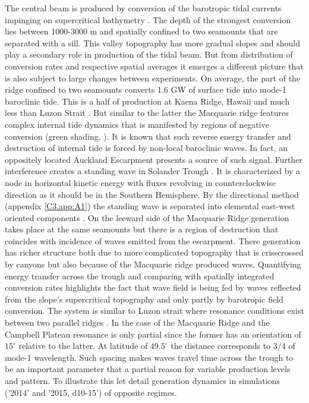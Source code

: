 \documentclass[12pt]{article}
\begin{document}
The central beam is produced by conversion of the barotropic tidal currents impinging on 
supercritical bathymetry . The depth of the strongest conversion lies between 
1000-3000 m and spatially 
confined 
to two seamounts that are separated with a sill. This valley topography has more gradual slopes and 
should play 
a secondary role in production of the tidal beam. But from distribution of conversion rates 
 and respective spatial averages  it emerges a 
different picture that is also subject to large changes between experiments. On average, 
the part of the ridge confined to two seamounts converts 1.6 GW of surface tide into mode-1 
baroclinic tide. This is a half of production at Kaena Ridge, 
Hawaii 
\citep{carter2008energetics} and much less than Luzon Strait \citep{}. But similar to the latter 
the Macquarie ridge features complex internal tide dynamics that is manifested by regions of 
negative conversion (green shading, ). It is known \citep{Kelly2010a} 
that such reverse energy transfer and destruction of internal tide is forced by non-local 
baroclinic 
waves. In fact, an oppositely located Auckland Escarpment presents a source of such signal. Further 
interference creates a standing wave in Solander Trough . It is 
characterized by a node in horizontal kinetic energy with fluxes revolving in counterclockwise 
direction  as it should be in the Southern Hemisphere. By the directional 
method (appendix \ref{C3.app:A1}) the standing wave is separated into elemental east-west oriented 
components . On the leeward side of the Macquarie Ridge generation 
takes place at the same seamounts but there is a region of destruction that coincides with 
incidence of waves emitted from the escarpment. There generation has richer structure both due to 
more complicated topography that is crisscrossed by canyons but also because of the Macquarie ridge 
produced waves. Quantifying energy transfer across the trough and comparing with spatially 
integrated conversion rates highlights the fact that wave field is being fed by waves reflected 
from the slope's supercritical topography and only partly by barotropic field conversion. The 
system is similar to Luzon strait where resonance conditions exist between two parallel ridges 
\citep{buijsman2014three}. In 
the case of the Macquarie Ridge and the Campbell Plateau resonance is only partial since the former 
has an orientation of $15^{\circ}$ relative to the latter. At latitude of $49.5^{\circ}$ the 
distance corresponds to 3/4 of mode-1 wavelength. Such spacing makes waves travel time across the 
trough to be an important parameter that a partial reason for variable production levels and 
pattern. To illustrate this let detail generation dynamics in simulations ('2014' and '2015, 
d10-15') of opposite regimes.\\
\end{document}
